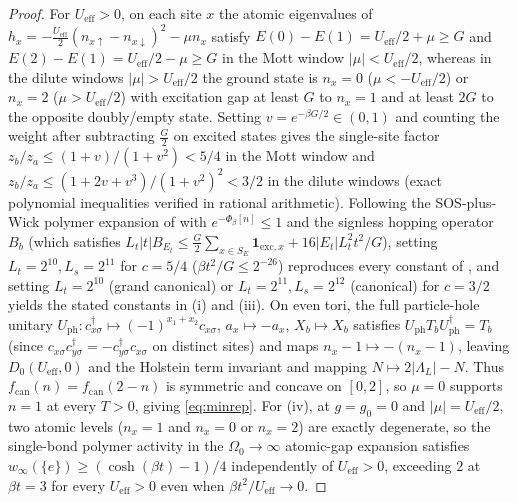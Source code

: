 \documentclass[11pt]{article}
\theoremstyle{definition}
\theoremstyle{remark}
\newcommand{\eff}{\mathrm{eff}}
\newcommand{\Ueff}{U_{\eff}}
\begin{document}
\begin{proof}
For $\Ueff>0$, on each site $x$ the atomic eigenvalues of
$h_x=-\frac{\Ueff}{2}(n_{x\uparrow}-n_{x\downarrow})^2-\mu n_x$ satisfy
$E(0)-E(1)=\Ueff/2+\mu\ge G$ and $E(2)-E(1)=\Ueff/2-\mu\ge G$ in the Mott window
$|\mu|<\Ueff/2$, whereas in the dilute windows $|\mu|>\Ueff/2$ the ground state is
$n_x=0$ ($\mu<-\Ueff/2$) or $n_x=2$ ($\mu>\Ueff/2$) with excitation gap at least
$G$ to $n_x=1$ and at least $2G$ to the opposite doubly/empty state. Setting
$v=e^{-\beta G/2}\in(0,1)$ and counting the weight after subtracting $\frac{G}{2}$
on excited states gives the single-site factor $z_b/z_a\le(1+v)/(1+v^2)<5/4$ in the
Mott window and $z_b/z_a\le(1+2v+v^3)/(1+v^2)^2<3/2$ in the dilute windows (exact
polynomial inequalities verified in rational arithmetic). Following the SOS-plus-Wick
polymer expansion of \cite{sshbond3} with $e^{-\Phi_\beta[n]}\le1$ and the
signless hopping operator $B_b$ (which satisfies $L_t|t|B_{E_t}\le\frac{G}{2}
\sum_{x\in S_E}\mathbf{1}_{\mathrm{exc},x}+16|E_t|L_t^2 t^2/G$), setting
$L_t=2^{10},L_s=2^{11}$ for $c=5/4$ ($\beta t^2/G\le2^{-26}$) reproduces every
constant of \cite{sshbond3}, and setting $L_t=2^{10}$ (grand canonical) or
$L_t=2^{11},L_s=2^{12}$ (canonical) for $c=3/2$ yields the stated constants in
(i) and (iii). On even tori, the full particle-hole unitary
$U_{\mathrm{ph}}:c_{x\sigma}^\dagger\mapsto(-1)^{x_1+x_2}c_{x\sigma}$,
$a_x\mapsto-a_x$, $X_b\mapsto X_b$ satisfies $U_{\mathrm{ph}}T_b
U_{\mathrm{ph}}^\dagger=T_b$ (since $c_{x\sigma}c_{y\sigma}^\dagger
=-c_{y\sigma}^\dagger c_{x\sigma}$ on distinct sites) and maps $n_x-1\mapsto-(n_x-1)$,
leaving $D_0(\Ueff,0)$ and the Holstein term invariant and mapping
$N\mapsto2|\Lambda_L|-N$. Thus $f_{\mathrm{can}}(n)=f_{\mathrm{can}}(2-n)$ is
symmetric and concave on $[0,2]$, so $\mu=0$ supports $n=1$ at every $T>0$, giving
\eqref{eq:minrep}. For (iv), at $g=g_0=0$ and $|\mu|=\Ueff/2$, two atomic levels
($n_x=1$ and $n_x=0$ or $n_x=2$) are exactly degenerate, so the single-bond polymer
activity in the $\Omega_0\to\infty$ atomic-gap expansion satisfies
$w_\infty(\{e\})\ge(\cosh(\beta t)-1)/4$ independently of $\Ueff>0$, exceeding $2$
at $\beta t=3$ for every $\Ueff>0$ even when $\beta t^2/\Ueff\to0$.
\end{proof}
\end{document}
